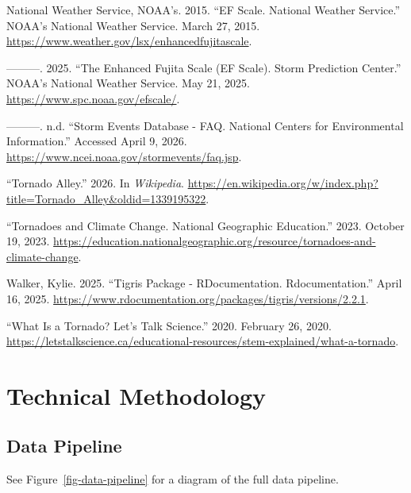 \documentclass[
  letterpaper,
  DIV=11,
  numbers=noendperiod]{scrreprt}
\newlength{\cslhangindent}
\newenvironment{CSLReferences}[2] %
 {\begin{list}{}{%
  \setlength{\itemindent}{0pt}
  \setlength{\leftmargin}{0pt}
  \setlength{\parsep}{0pt}
  \ifodd #1
   \setlength{\leftmargin}{\cslhangindent}
   \setlength{\itemindent}{-1\cslhangindent}
  \fi
  \setlength{\itemsep}{#2\baselineskip}}}
 {\end{list}}
\begin{document}
\begin{CSLReferences}{1}{0}
National Weather Service, NOAA's. 2015. {``{EF} Scale. National Weather
Service.''} {NOAA}'s National Weather Service. March 27, 2015.
\url{https://www.weather.gov/lsx/enhancedfujitascale}.

---------. 2025. {``The Enhanced Fujita Scale ({EF} Scale). Storm
Prediction Center.''} {NOAA}'s National Weather Service. May 21, 2025.
\url{https://www.spc.noaa.gov/efscale/}.

---------. n.d. {``Storm Events Database - {FAQ}. National Centers for
Environmental Information.''} Accessed April 9, 2026.
\url{https://www.ncei.noaa.gov/stormevents/faq.jsp}.

{``Tornado Alley.''} 2026. In \emph{Wikipedia}.
\url{https://en.wikipedia.org/w/index.php?title=Tornado_Alley&oldid=1339195322}.

{``Tornadoes and Climate Change. National Geographic Education.''} 2023.
October 19, 2023.
\url{https://education.nationalgeographic.org/resource/tornadoes-and-climate-change}.

Walker, Kylie. 2025. {``Tigris Package - {RDocumentation}.
Rdocumentation.''} April 16, 2025.
\url{https://www.rdocumentation.org/packages/tigris/versions/2.2.1}.

{``What Is a Tornado? Let's Talk Science.''} 2020. February 26, 2020.
\url{https://letstalkscience.ca/educational-resources/stem-explained/what-a-tornado}.

\end{CSLReferences}

\cleardoublepage
{}
{}
\appendix

\chapter{Technical Methodology}\label{sec-tech-methods}

\section{Data Pipeline}\label{data-pipeline-1}

\begin{tcolorbox}[enhanced jigsaw, bottomrule=.15mm, colframe=quarto-callout-note-color-frame, colback=white, opacityback=0, toptitle=1mm, leftrule=.75mm, arc=.35mm, title=\textcolor{quarto-callout-note-color}{\faInfo}\hspace{0.5em}{Note}, bottomtitle=1mm, colbacktitle=quarto-callout-note-color!10!white, coltitle=black, breakable, titlerule=0mm, opacitybacktitle=0.6, rightrule=.15mm, toprule=.15mm, left=2mm]

See Figure~\ref{fig-data-pipeline} for a diagram of the full data
pipeline.

\end{tcolorbox}
\end{document}
